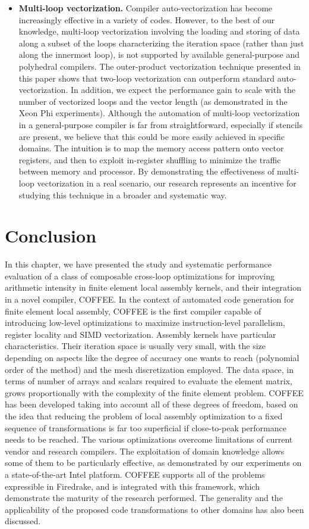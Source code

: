 \begin{itemize}
\item \textbf{Multi-loop vectorization.} Compiler auto-vectorization has become increasingly effective in a variety of codes. However, to the best of our knowledge, multi-loop vectorization involving the loading and storing of data along a subset of the loops characterizing the iteration space (rather than just along the innermost loop), is not supported by available general-purpose and polyhedral compilers. The outer-product vectorization technique presented in this paper shows that two-loop vectorization can outperform standard auto-vectorization. In addition, we expect the performance gain to scale with the number of vectorized loops and the vector length (as demonstrated in  the Xeon Phi experiments). Although the automation of multi-loop vectorization in a general-purpose compiler is far from straightforward, especially if stencils are present, we believe that this could be more easily achieved in specific domains. The intuition is to map the memory access pattern onto vector registers, and then to exploit in-register shuffling to minimize the traffic between memory and processor. By demonstrating the effectiveness of multi-loop vectorization in a real scenario, our research represents an incentive for studying this technique in a broader and systematic way.
\end{itemize}

\section{Conclusion}
\label{sec:coffee-conclusion}
In this chapter, we have presented the study and systematic performance evaluation of a class of composable cross-loop optimizations for improving arithmetic intensity in finite element local assembly kernels, and their integration in a novel compiler, COFFEE. In the context of automated code generation for finite element local assembly, COFFEE is the first compiler capable of introducing low-level optimizations to maximize instruction-level parallelism, register locality and SIMD vectorization. Assembly kernels have particular characteristics. Their iteration space is usually very small, with the size depending on aspects like the degree of accuracy one wants to reach (polynomial order of the method) and the mesh discretization employed. The data space, in terms of number of arrays and scalars required to evaluate the element matrix, grows proportionally with the complexity of the finite element problem. COFFEE has been developed taking into account all of these degrees of freedom, based on the idea that reducing the problem of local assembly optimization to a fixed sequence of transformations is far too superficial if close-to-peak performance needs to be reached. The various optimizations overcome limitations of current vendor and research compilers. The exploitation of domain knowledge allows some of them to be particularly effective, as demonstrated by our experiments on a state-of-the-art Intel platform. COFFEE supports all of the problems expressible in Firedrake, and is integrated with this framework, which demonstrate the maturity of the research performed. The generality and the applicability of the proposed code transformations to other domains has also been discussed.